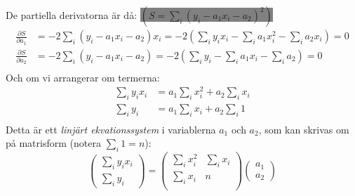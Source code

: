 \documentclass[9pt]{beamer}
\begin{document}
    
    \begin{frame}
        \onslide<+->
        De partiella derivatorna är då: \null\hfill  \colorbox{gray}{$\left(S = \sum\limits_i\left(y_i - a_1x_i - a_2 \right)^2\right)$}
        \begin{align*}
            \frac{\partial S}{\partial a_1} &= -2\sum_i(y_i - a_1x_i - a_2)x_i = -2\left(\sum_i y_ix_i - \sum_i a_1 x_i^2 - \sum_i a_2 x_i\right) = 0 \\
            \frac{\partial S}{\partial a_2} &= -2\sum_i (y_i - a_1x_i - a_2) = -2\left(\sum_i y_i - \sum_i a_1x_i - \sum_i a_2\right)= 0 \\
        \end{align*}
        \onslide<+->
        Och om vi arrangerar om termerna:
        \begin{align*}
            \sum_i y_ix_i &= a_1 \sum_i x_i^2 + a_2 \sum_i x_i \\%
            \sum_i y_i &= a_1 \sum_i x_i + a_2 \sum_i 1 \\ %
        \end{align*}
        Detta är ett \emph{linjärt ekvationssystem} i variablerna $a_1$ och $a_2$,
        som kan skrivas om på matrisform (notera $\sum\limits_i 1 = n$):
        \begin{equation*}
            \begin{pmatrix}
                \sum_i y_ix_i \\
                \sum_i y_i
            \end{pmatrix} =
            \begin{pmatrix}
                \sum_i x_i^2 & \sum_ix_i \\
                \sum_i x_i  & n \\
            \end{pmatrix}
            \begin{pmatrix}
                a_1 \\
                a_2
            \end{pmatrix}
        \end{equation*}
    \end{frame}
\end{document}
